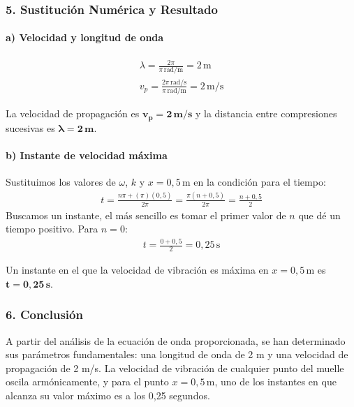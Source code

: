 \subsubsection*{5. Sustitución Numérica y Resultado}
\paragraph*{a) Velocidad y longitud de onda}
\begin{gather}
    \lambda = \frac{2\pi}{\pi\,\text{rad/m}} = 2\,\text{m} \\
    v_p = \frac{2\pi\,\text{rad/s}}{\pi\,\text{rad/m}} = 2\,\text{m/s}
\end{gather}
\begin{cajaresultado}
La velocidad de propagación es $\boldsymbol{v_p = 2\,\textbf{m/s}}$ y la distancia entre compresiones sucesivas es $\boldsymbol{\lambda=2\,\textbf{m}}$.
\end{cajaresultado}

\paragraph*{b) Instante de velocidad máxima}
Sustituimos los valores de $\omega$, $k$ y $x=0,5\,\text{m}$ en la condición para el tiempo:
\begin{gather}
    t = \frac{n\pi + (\pi)(0,5)}{2\pi} = \frac{\pi(n + 0,5)}{2\pi} = \frac{n+0,5}{2}
\end{gather}
Buscamos un instante, el más sencillo es tomar el primer valor de $n$ que dé un tiempo positivo. Para $n=0$:
\begin{gather}
    t = \frac{0+0,5}{2} = 0,25\,\text{s}
\end{gather}
\begin{cajaresultado}
Un instante en el que la velocidad de vibración es máxima en $x=0,5\,\text{m}$ es $\boldsymbol{t=0,25\,\textbf{s}}$.
\end{cajaresultado}

\subsubsection*{6. Conclusión}
\begin{cajaconclusion}
A partir del análisis de la ecuación de onda proporcionada, se han determinado sus parámetros fundamentales: una longitud de onda de 2 m y una velocidad de propagación de 2 m/s. La velocidad de vibración de cualquier punto del muelle oscila armónicamente, y para el punto $x=0,5\,\text{m}$, uno de los instantes en que alcanza su valor máximo es a los 0,25 segundos.
\end{cajaconclusion}

